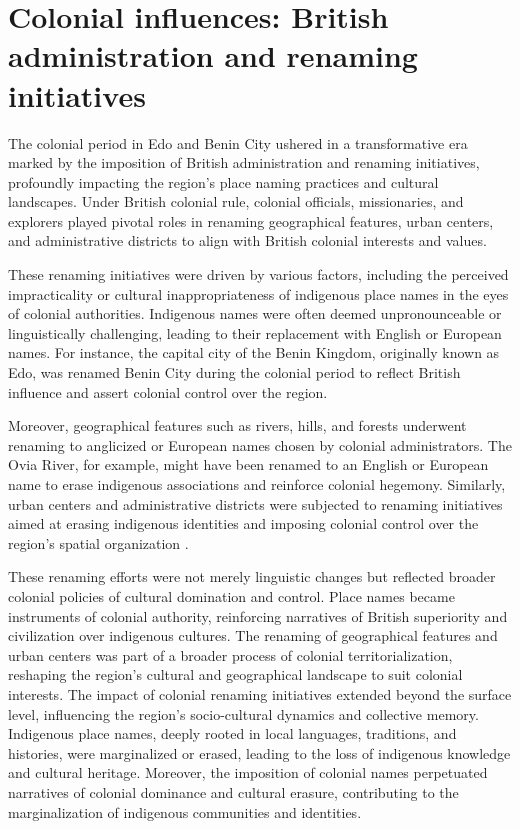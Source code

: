 \section{Colonial influences: British administration and renaming initiatives}

The colonial period in Edo and Benin City ushered in a transformative era marked by the imposition of British administration and renaming initiatives, profoundly impacting the region's place naming practices and cultural landscapes. Under British colonial rule, colonial officials, missionaries, and explorers played pivotal roles in renaming geographical features, urban centers, and administrative districts to align with British colonial interests and values\cite{Afigbo1982}. 

These renaming initiatives were driven by various factors, including the perceived impracticality or cultural inappropriateness of indigenous place names in the eyes of colonial authorities. Indigenous names were often deemed unpronounceable or linguistically challenging, leading to their replacement with English or European names\cite{crowder2023british}. For instance, the capital city of the Benin Kingdom, originally known as Edo, was renamed Benin City during the colonial period to reflect British influence and assert colonial control over the region\cite{egharevba1968short}.

Moreover, geographical features such as rivers, hills, and forests underwent renaming to anglicized or European names chosen by colonial administrators. The Ovia River, for example, might have been renamed to an English or European name to erase indigenous associations and reinforce colonial hegemony. Similarly, urban centers and administrative districts were subjected to renaming initiatives aimed at erasing indigenous identities and imposing colonial control over the region's spatial organization \cite{Igbafe}.

These renaming efforts were not merely linguistic changes but reflected broader colonial policies of cultural domination and control. Place names became instruments of colonial authority, reinforcing narratives of British superiority and civilization over indigenous cultures. The renaming of geographical features and urban centers was part of a broader process of colonial territorialization, reshaping the region's cultural and geographical landscape to suit colonial interests\cite{Igbafe}.
The impact of colonial renaming initiatives extended beyond the surface level, influencing the region's socio-cultural dynamics and collective memory. Indigenous place names, deeply rooted in local languages, traditions, and histories, were marginalized or erased, leading to the loss of indigenous knowledge and cultural heritage. Moreover, the imposition of colonial names perpetuated narratives of colonial dominance and cultural erasure, contributing to the marginalization of indigenous communities and identities\cite{Igbafe}.

